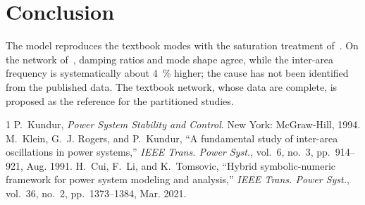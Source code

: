 \documentclass[conference]{IEEEtran}
\begin{document}
\section{Conclusion}
The model reproduces the textbook modes with the saturation treatment of~\cite{kundur}. On the network of~\cite{klein}, damping ratios and mode shape agree, while the inter-area frequency is systematically about \SI{4}{\percent} higher; the cause has not been identified from the published data. The textbook network, whose data are complete, is proposed as the reference for the partitioned studies.

\begin{thebibliography}{1}
 P.~Kundur, \emph{Power System Stability and Control}. New York: McGraw-Hill, 1994.
 M.~Klein, G.~J. Rogers, and P.~Kundur, ``A fundamental study of inter-area oscillations in power systems,'' \emph{IEEE Trans. Power Syst.}, vol.~6, no.~3, pp.~914--921, Aug. 1991.
 H.~Cui, F.~Li, and K.~Tomsovic, ``Hybrid symbolic-numeric framework for power system modeling and analysis,'' \emph{IEEE Trans. Power Syst.}, vol.~36, no.~2, pp.~1373--1384, Mar. 2021.
\end{thebibliography}
\end{document}
